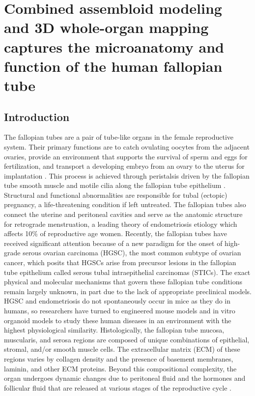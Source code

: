 \chapter{Combined assembloid modeling and 3D whole-organ mapping captures the microanatomy and function of the human fallopian tube} \label{chap:chap-4}

\begin{refsection}
    \section{Introduction}
    
    The fallopian tubes are a pair of tube-like organs in the female reproductive system. Their primary functions are to catch ovulating oocytes from the adjacent ovaries, provide an environment that supports the survival of sperm and eggs for fertilization, and transport a developing embryo from an ovary to the uterus for implantation \cite{croxatto2002a,leese2001a}. This process is achieved through peristalsis driven by the fallopian tube smooth muscle and motile cilia along the fallopian tube epithelium \cite{croxatto2002a,leese2001a}. Structural and functional abnormalities are responsible for tubal (ectopic) pregnancy, a life-threatening condition if left untreated\cite{chua2017a,shao2010a}. The fallopian tubes also connect the uterine and peritoneal cavities and serve as the anatomic structure for retrograde menstruation, a leading theory of endometriosis etiology which affects 10\% of reproductive age women\cite{zondervan2018a,shafrir2018a}. Recently, the fallopian tubes have received significant attention because of a new paradigm for the onset of high-grade serous ovarian carcinoma (HGSC), the most common subtype of ovarian cancer, which posits that HGSCs arise from precursor lesions in the fallopian tube epithelium called serous tubal intraepithelial carcinomas (STICs)\cite{labidi-galy2017a,shih2021a}. The exact physical and molecular mechanisms that govern these fallopian tube conditions remain largely unknown, in part due to the lack of appropriate preclinical models\cite{chumduri2021a,alzamil2021a}. HGSC and endometriosis do not spontaneously occur in mice as they do in humans\cite{lengyel2014a,rangarajan2004a,jones2013a,mccloskey2014a,gruemmer2006a,greaves2014a,zondervan2018a}, so researchers have turned to engineered mouse models and in vitro organoid models to study these human diseases in an environment with the highest physiological similarity\cite{alzamil2021a,howell2014a,murphy2022a}. 
    Histologically, the fallopian tube mucosa, muscularis, and serosa regions are composed of unique combinations of epithelial, stromal, and/or smooth muscle cells\cite{wheeler1982a,popescu2005a}. The extracellular matrix (ECM) of these regions varies by collagen density and the presence of basement membranes, laminin, and other ECM proteins\cite{popescu2005a}. Beyond this compositional complexity, the organ undergoes dynamic changes due to peritoneal fluid\cite{lyons2002a} and the hormones and follicular fluid that are released at various stages of the reproductive cycle \cite{lyons2002a,amso1994a,crow1994a}.

\end{refsection}
